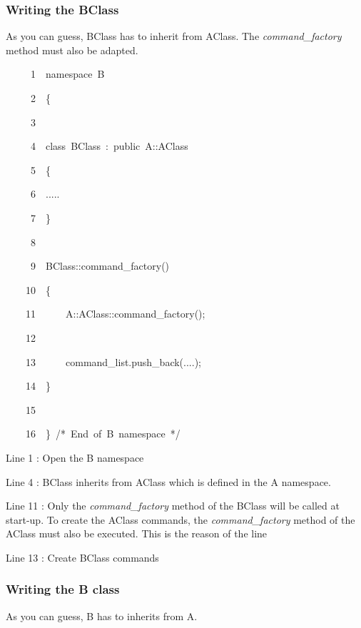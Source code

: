 \subsubsection{Writing the BClass}

As you can guess, BClass has to inherit from AClass. The \emph{command\_factory}
method must also be adapted.


\begin{lyxcode}
~~~~~1~~namespace~B

~~~~~2~~\{

~~~~~3~~

~~~~~4~~class~BClass~:~public~A::AClass

~~~~~5~~\{

~~~~~6~~.....

~~~~~7~~\}

~~~~~8~~

~~~~~9~~BClass::command\_factory()

~~~~10~~\{

~~~~11~~~~~~A::AClass::command\_factory();

~~~~12~~

~~~~13~~~~~~command\_list.push\_back(....);

~~~~14~~\}

~~~~15~~

~~~~16~~\}~/{*}~End~of~B~namespace~{*}/
\end{lyxcode}


Line 1 : Open the B namespace

Line 4 : BClass inherits from AClass which is defined in the A namespace.

Line 11 : Only the \emph{command\_factory} method of the BClass will
be called at start-up. To create the AClass commands, the \emph{command\_factory}
method of the AClass must also be executed. This is the reason of
the line

Line 13 : Create BClass commands

\subsubsection{Writing the B class}

As you can guess, B has to inherits from A.

